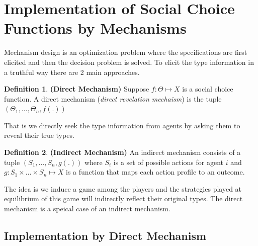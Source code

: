 \documentclass{article}
\theoremstyle{definition}
\newtheorem{defn}{Definition}[section]
\begin{document}
\section{Implementation of Social Choice Functions by Mechanisms}
Mechanism design is an optimization problem where the specifications are first elicited and then the decision problem is solved. To elicit the type information in a truthful way there are 2 main approaches.
\begin{defn}
\textbf{(Direct Mechanism)} Suppose $f:\Theta\mapsto X$ is a social choice function. A direct mechanism (\textit{direct revelation mechaism}) is the tuple $(\Theta_1,\dots,\Theta_n,f(.))$
\end{defn}
That is we directly seek the type information from agents by asking them to reveal their true types.
\begin{defn}
\textbf{(Indirect Mechanism)} An indirect mechanism consists of a tuple $(S_1,\dots,S_n, g(.))$ where $S_i$ is a set of possible actions for agent $i$ and $g: S_1\times \dots\times S_n \mapsto X$ is a function that maps each action profile to an outcome.
\end{defn}
The idea is we induce a game among the players and the strategies played at equilibrium of this game will indirectly reflect their original types. The direct mechanism is a speical case of an indirect mechanism.
\subsection{Implementation by Direct Mechanism}
\end{document}
